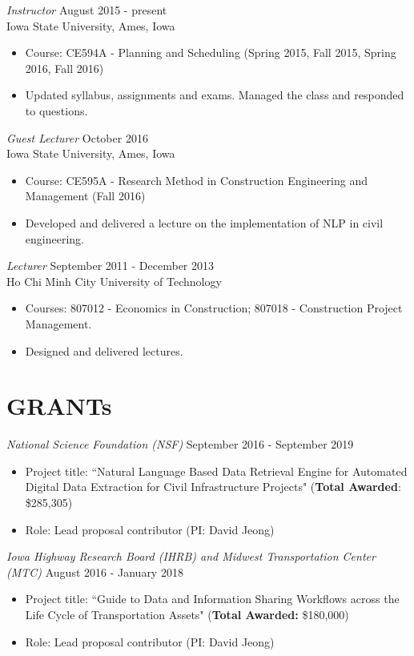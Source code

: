 \documentclass[11pt]{article}
\begin{document}
{\sl Instructor} \hfill August 2015 - present \\
Iowa State University, Ames, Iowa
\begin{itemize}
\item Course: CE594A - Planning and Scheduling (Spring 2015, Fall 2015, Spring 2016, Fall 2016)
\item Updated syllabus, assignments and exams. Managed the class and responded to questions.
\end{itemize}

{\sl Guest Lecturer} \hfill October 2016 \\
Iowa State University, Ames, Iowa
\begin{itemize}
\item Course: CE595A - Research Method in Construction Engineering and Management (Fall 2016) 
\item Developed and delivered a lecture on the implementation of NLP in civil engineering.
\end{itemize}

{\sl Lecturer} \hfill September 2011 - December 2013 \\
Ho Chi Minh City University of Technology
\begin{itemize}
\item Courses: 807012 - Economics in Construction; 807018 - Construction Project Management.
\item Designed and delivered lectures. 
\end{itemize} 
\section*{GRANTs}

{\sl National Science Foundation (NSF)} \hfill September 2016 - September 2019 
\begin{itemize}
\item Project title: ``Natural Language Based Data Retrieval Engine for Automated Digital Data Extraction for Civil Infrastructure Projects" ({\bf Total Awarded}: \$285,305)
\item Role: Lead proposal contributor (PI: David Jeong)
\end{itemize} 

{\sl Iowa Highway Research Board (IHRB) and Midwest Transportation Center (MTC)} \hfill August 2016 - January 2018
\begin{itemize}
\item Project title: ``Guide to Data and Information Sharing Workflows across the Life Cycle of Transportation Assets" ({\bf Total Awarded:} \$180,000)
\item Role: Lead proposal contributor (PI: David Jeong)
\end{itemize} 
\end{document}
